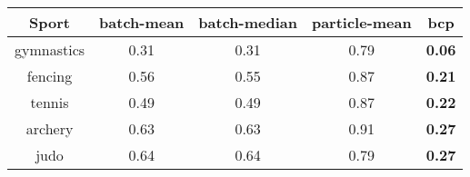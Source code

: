 \begin{tabular}{|c|c|c|c|c|}
\hline
Sport & batch-mean & batch-median & particle-mean & bcp \\
\hline
gymnastics & 0.31 & 0.31 & 0.79 & \textbf{0.06} \\
fencing & 0.56 & 0.55 & 0.87 & \textbf{0.21} \\
tennis & 0.49 & 0.49 & 0.87 & \textbf{0.22} \\
archery & 0.63 & 0.63 & 0.91 & \textbf{0.27} \\
judo & 0.64 & 0.64 & 0.79 & \textbf{0.27} \\
\hline
\end{tabular}
